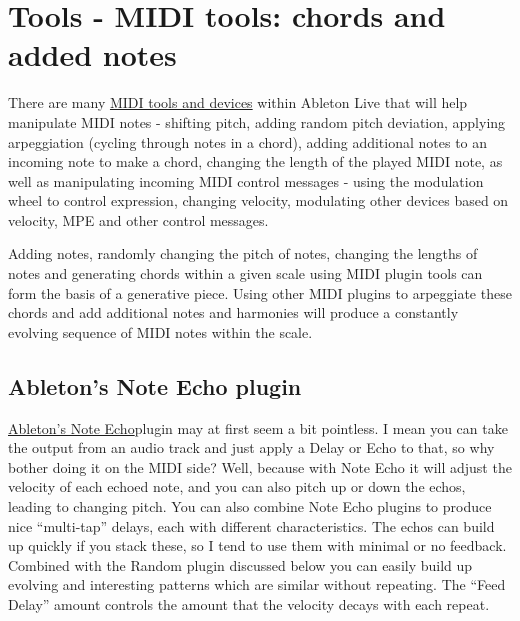 \documentclass[
  12pt,
  letterpaper,
  oneside,
  open=any]{scrbook}
\begin{document}

\chapter{Tools - MIDI tools: chords and added
notes}\label{Chapter-004-Tools-MIDI_tools}

There are many
\href{https://www.ableton.com/en/live-manual/11/live-midi-effect-reference/\#live-midi-effect-reference}{MIDI
tools and devices} within Ableton Live that will help manipulate MIDI
notes - shifting pitch, adding random pitch deviation, applying
arpeggiation (cycling through notes in a chord), adding additional notes
to an incoming note to make a chord, changing the length of the played
MIDI note, as well as manipulating incoming MIDI control messages -
using the modulation wheel to control expression, changing velocity,
modulating other devices based on velocity, MPE and other control
messages.

\begin{tcolorbox}[enhanced jigsaw, arc=.35mm, title=\textcolor{quarto-callout-tip-color}{\faLightbulb}\hspace{0.5em}{Key idea}, colback=white, opacitybacktitle=0.6, coltitle=black, toptitle=1mm, colframe=quarto-callout-tip-color-frame, bottomtitle=1mm, titlerule=0mm, rightrule=.15mm, bottomrule=.15mm, colbacktitle=quarto-callout-tip-color!10!white, toprule=.15mm, breakable, opacityback=0, left=2mm, leftrule=.75mm]

Adding notes, randomly changing the pitch of notes, changing the lengths
of notes and generating chords within a given scale using MIDI plugin
tools can form the basis of a generative piece. Using other MIDI plugins
to arpeggiate these chords and add additional notes and harmonies will
produce a constantly evolving sequence of MIDI notes within the scale.

\end{tcolorbox}

\section{Ableton's Note Echo plugin}\label{abletons-note-echo-plugin}

\href{https://www.ableton.com/en/live-manual/11/max-for-live-devices/\#note-echo}{Ableton's
Note Echo}plugin may at first seem a bit pointless. I mean you can take
the output from an audio track and just apply a Delay or Echo to that,
so why bother doing it on the MIDI side? Well, because with Note Echo it
will adjust the velocity of each echoed note, and you can also pitch up
or down the echos, leading to changing pitch. You can also combine Note
Echo plugins to produce nice ``multi-tap'' delays, each with different
characteristics. The echos can build up quickly if you stack these, so I
tend to use them with minimal or no feedback. Combined with the Random
plugin discussed below you can easily build up evolving and interesting
patterns which are similar without repeating. The ``Feed Delay'' amount
controls the amount that the velocity decays with each repeat.
\end{document}
